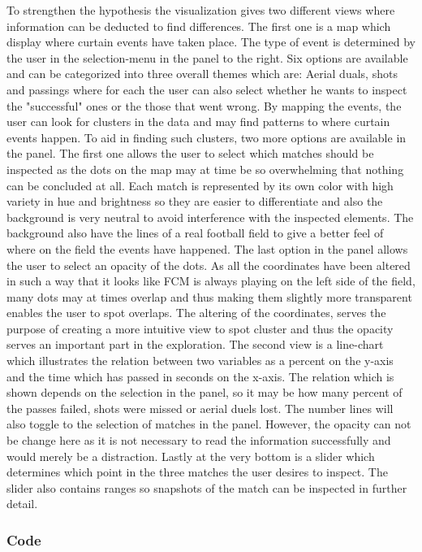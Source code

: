 \documentclass[Report.tex]{subfiles}
\begin{document}
To strengthen the hypothesis the visualization gives two different views where information can be deducted to find differences. The first one is a map which display where curtain events have taken place. The type of event is determined by the user in the selection-menu in the panel to the right. Six options are available and can be categorized into three overall themes which are: Aerial duals, shots and passings where for each the user can also select whether he wants to inspect the "successful" ones or the those that went wrong. By mapping the events, the user can look for clusters in the data and may find patterns to where curtain events happen. To aid in finding such clusters, two more options are available in the panel. The first one allows the user to select which matches should be inspected as the dots on the map may at time be so overwhelming that nothing can be concluded at all. Each match is represented by its own color with high variety in hue and brightness so they are easier to differentiate and also the background is very neutral to avoid interference with the inspected elements. The background also have the lines of a real football field to give a better feel of where on the field the events have happened. The last option in the panel allows the user to select an opacity of the dots. As all the coordinates have been altered in such a way that it looks like FCM is always playing on the left side of the field, many dots may at times overlap and thus making them slightly more transparent enables the user to spot overlaps. The altering of the coordinates, serves the purpose of creating a more intuitive view to spot cluster and thus the opacity serves an important part in the exploration. The second view is a line-chart which illustrates the relation between two variables as a percent on the y-axis and the time which has passed in seconds on the x-axis. The relation which is shown depends on the selection in the panel, so it may be how many percent of the passes failed, shots were missed or aerial duels lost. The number lines will also toggle to the selection of matches in the panel. However, the opacity can not be change here as it is not necessary to read the information successfully and would merely be a distraction. Lastly at the very bottom is a slider which determines which point in the three matches the user desires to inspect. The slider also contains ranges so snapshots of the match can be inspected in further detail.
\subsubsection{Code}
\end{document}
